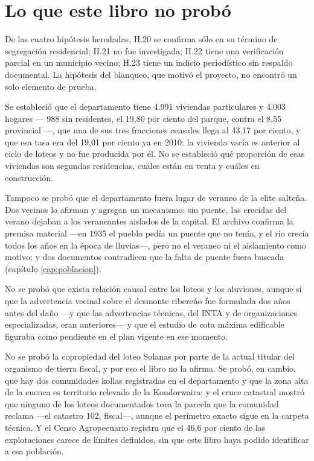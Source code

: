 \section{Lo que este libro no probó}

De las cuatro hipótesis heredadas, H.20 se confirma sólo en su término de segregación residencial; H.21 no fue investigada; H.22 tiene una verificación parcial en un municipio vecino; H.23 tiene un indicio periodístico sin respaldo documental. La hipótesis del blanqueo, que motivó el proyecto, no encontró un solo elemento de prueba.

Se estableció que el departamento tiene 4.991 viviendas particulares y 4.003 hogares --- 988 sin residentes, el 19,80 por ciento del parque, contra el 8,55 provincial ---, que una de sus tres fracciones censales llega al 43,17 por ciento, y que esa tasa era del 19,01 por ciento ya en 2010: la vivienda vacía es anterior al ciclo de loteos y no fue producida por él. No se estableció qué proporción de esas viviendas son segundas residencias, cuáles están en venta y cuáles en construcción.

Tampoco se probó que el departamento fuera lugar de veraneo de la elite salteña. Dos vecinos lo afirman y agregan un mecanismo: sin puente, las crecidas del verano dejaban a los veraneantes aislados de la capital. El archivo confirma la premisa material ---en 1935 el pueblo pedía un puente que no tenía, y el río crecía todos los años en la época de lluvias---, pero no el veraneo ni el aislamiento como motivo; y dos documentos contradicen que la falta de puente fuera buscada (capítulo \ref{cap:poblacion}).

No se probó que exista relación causal entre los loteos y los aluviones, aunque sí que la advertencia vecinal sobre el desmonte ribereño fue formulada dos años antes del daño ---y que las advertencias técnicas, del INTA y de organizaciones especializadas, eran anteriores--- y que el estudio de cota máxima edificable figuraba como pendiente en el plan vigente en ese momento.

No se probó la copropiedad del loteo Solanas por parte de la actual titular del organismo de tierra fiscal, y por eso el libro no la afirma. Se probó, en cambio, que hay dos comunidades kollas registradas en el departamento y que la zona alta de la cuenca es territorio relevado de la Kondorwaira; y el cruce catastral mostró que ninguno de los loteos documentados toca la parcela que la comunidad reclama ---el catastro 102, fiscal---, aunque el perímetro exacto sigue en la carpeta técnica. Y el Censo Agropecuario registra que el 46,6 por ciento de las explotaciones carece de límites definidos, sin que este libro haya podido identificar a esa población.

